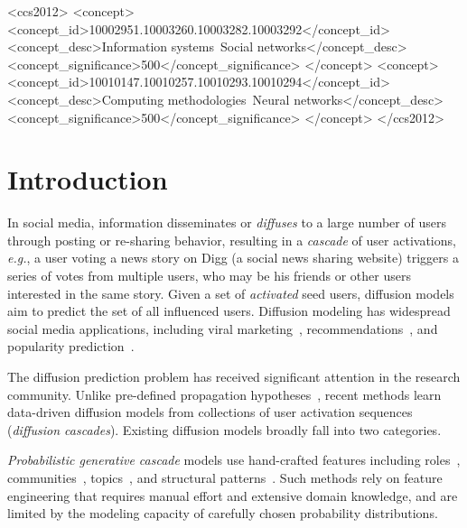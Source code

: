 \documentclass[sigconf]{acmart}
\begin{document}
\begin{CCSXML}
<ccs2012>
<concept>
<concept_id>10002951.10003260.10003282.10003292</concept_id>
<concept_desc>Information systems~Social networks</concept_desc>
<concept_significance>500</concept_significance>
</concept>
<concept>
<concept_id>10010147.10010257.10010293.10010294</concept_id>
<concept_desc>Computing methodologies~Neural networks</concept_desc>
<concept_significance>500</concept_significance>
</concept>
</ccs2012>
\end{CCSXML}


\maketitle



\section{Introduction}
\label{sec:intro}
In social media, information disseminates or \emph{diffuses} to a large number of users through posting or re-sharing behavior, resulting in a \textit{cascade} of user activations, \textit{e.g.}, a user voting a news story on Digg (a social news sharing website) triggers a series of votes from multiple users, who may be his friends or other users interested in the same story.
Given a set of \textit{activated} seed users, diffusion models aim to predict the set of all influenced users.
Diffusion modeling has widespread social media applications, including viral marketing~\cite{viral}, recommendations~\cite{recom, longtail}, and popularity prediction~\cite{popularity}.

The diffusion prediction problem has received significant attention in the research community.
Unlike pre-defined propagation hypotheses~\cite{ic}, recent methods learn data-driven diffusion models from collections of user activation sequences (\textit{diffusion cascades}).
Existing diffusion models broadly fall into two categories.

\textit{Probabilistic generative cascade} models use hand-crafted features including roles~\cite{rain}, communities~\cite{cic-icdm}, topics~\cite{topic-ic}, and structural patterns~\cite{structinf}. Such methods
rely on feature engineering that requires manual effort and extensive domain knowledge, and are limited by the modeling capacity of carefully chosen probability distributions.
\end{document}

